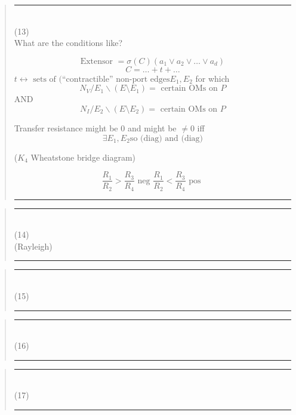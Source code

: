 \documentclass{article}
\begin{document}
\pagebreak[3] \begin{quote}\rule{\textwidth}{3pt}\\
(13)\\
What are the conditions like?

\[
\text{Extensor\ }= \sigma(C)(a_1\vee a_2\vee \ldots \vee a_d)
\]
\[
C = \ldots + t + \ldots
\]
$t \leftrightarrow \text{\ sets of (``contractible'' non-port edges} 
E_1, E_2$ for which
\[
N_V/E_1\backslash(E\setminus E_1) = \text{\ certain OMs on\ } P
\]
AND
\[
N_I/E_2\backslash(E\setminus E_2) = \text{\ certain OMs on\ } P
\]

Transfer resistance might be 0 and might be $\neq 0$ iff
\[
\exists E_1, E_2 \text{so (diag) and (diag)}
\]

($K_4$ Wheatstone bridge diagram)

\[
\frac{R_1}{R_2} > \frac{R_3}{R_4} 
\text{\ neg\ }
\frac{R_1}{R_2} < \frac{R_3}{R_4} 
\text{\ pos\ }
\]

\rule{\textwidth}{3pt}
\end{quote}

\pagebreak[3] \begin{quote}\rule{\textwidth}{3pt}\\
(14)\\
(Rayleigh)



\rule{\textwidth}{3pt}
\end{quote}

\pagebreak[3] \begin{quote}\rule{\textwidth}{3pt}\\
(15)\\


\rule{\textwidth}{3pt}
\end{quote}

\pagebreak[3] \begin{quote}\rule{\textwidth}{3pt}\\
(16)\\


\rule{\textwidth}{3pt}
\end{quote}

\pagebreak[3] \begin{quote}\rule{\textwidth}{3pt}\\
(17)\\


\rule{\textwidth}{3pt}
\end{quote}




{}

\end{document}

